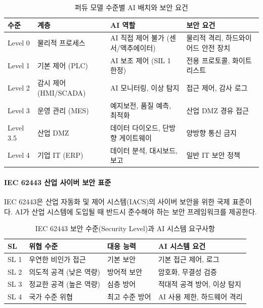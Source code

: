 \begin{table}[htbp]
\centering
\caption{퍼듀 모델 수준별 AI 배치와 보안 요건}
\label{tab:19_purdue}
\begin{tabularx}{\textwidth}{p{1.5cm}p{2.5cm}Xp{3.5cm}}
\toprule
\textbf{수준} & \textbf{계층} & \textbf{AI 역할} & \textbf{보안 요건} \\
\midrule
Level 0 & 물리적 프로세스 & AI 직접 제어 불가 (센서/액추에이터) & 물리적 격리, 하드와이어드 안전 장치 \\
Level 1 & 기본 제어 (PLC) & AI 보조 제어 (SIL 1 한정) & 전용 프로토콜, 화이트리스트 \\
Level 2 & 감시 제어 (HMI/SCADA) & AI 모니터링, 이상 탐지 & 접근 제어, 감사 로그 \\
Level 3 & 운영 관리 (MES) & 예지보전, 품질 예측, 최적화 & 산업 DMZ 경유 접근 \\
Level 3.5 & 산업 DMZ & 데이터 다이오드, 단방향 게이트웨이 & 양방향 통신 금지 \\
Level 4 & 기업 IT (ERP) & 데이터 분석, 대시보드, 보고 & 일반 IT 보안 정책 \\
\bottomrule
\end{tabularx}
\end{table}

\paragraph{IEC 62443 산업 사이버 보안 표준}

IEC 62443은 산업 자동화 및 제어 시스템(IACS)의 사이버 보안을 위한 국제 표준이다. AI가 산업 시스템에 도입될 때 반드시 준수해야 하는 보안 프레임워크를 제공한다.

\begin{table}[htbp]
\centering
\caption{IEC 62443 보안 수준(Security Level)과 AI 시스템 요구사항}
\label{tab:19_iec62443}
\begin{tabularx}{\textwidth}{p{1.5cm}p{3cm}Xp{3cm}}
\toprule
\textbf{SL} & \textbf{위협 수준} & \textbf{대응 능력} & \textbf{AI 시스템 요건} \\
\midrule
SL 1 & 우연한 비인가 접근 & 기본 보안 & 기본 접근 제어, 로그 \\
SL 2 & 의도적 공격 (낮은 역량) & 방어적 보안 & 암호화, 무결성 검증 \\
SL 3 & 정교한 공격 (높은 역량) & 심층 방어 & 적대적 공격 방어, 이상 탐지 \\
SL 4 & 국가 수준 위협 & 최고 수준 방어 & AI 사용 제한, 하드웨어 격리 \\
\bottomrule
\end{tabularx}
\end{table}

